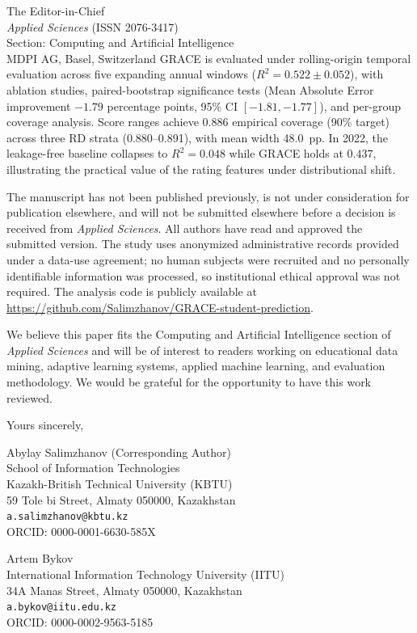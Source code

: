 \documentclass[12pt]{letter}
\begin{document}
\begin{letter}{The Editor-in-Chief \\
\textit{Applied Sciences} (ISSN 2076-3417) \\
Section: Computing and Artificial Intelligence \\
MDPI AG, Basel, Switzerland}
GRACE is evaluated under rolling-origin temporal evaluation across five expanding annual windows
($R^2 = 0.522 \pm 0.052$), with ablation studies, paired-bootstrap significance tests (Mean
Absolute Error improvement $-1.79$ percentage points, 95\% CI $[-1.81, -1.77]$), and per-group
coverage analysis. Score ranges achieve 0.886 empirical coverage (90\% target) across three RD strata (0.880--0.891), with mean width 48.0~pp.
In 2022, the leakage-free baseline collapses to $R^2 = 0.048$ while GRACE holds at $0.437$,
illustrating the practical value of the rating features under distributional shift.

The manuscript has not been published previously, is not under consideration for publication
elsewhere, and will not be submitted elsewhere before a decision is received from
\textit{Applied Sciences}. All authors have read and approved the submitted version. The study
uses anonymized administrative records provided under a data-use agreement; no human subjects
were recruited and no personally identifiable information was processed, so institutional ethical
approval was not required. The analysis code is publicly available at
\url{https://github.com/Salimzhanov/GRACE-student-prediction}.

We believe this paper fits the Computing and Artificial Intelligence section of
\textit{Applied Sciences} and will be of interest to readers working on educational data mining,
adaptive learning systems, applied machine learning, and evaluation methodology. We would be
grateful for the opportunity to have this work reviewed.

\closing{Yours sincerely,}

\noindent Abylay Salimzhanov (Corresponding Author)\\
School of Information Technologies\\
Kazakh-British Technical University (KBTU)\\
59 Tole bi Street, Almaty 050000, Kazakhstan\\
\texttt{a.salimzhanov@kbtu.kz}\\
ORCID: 0000-0001-6630-585X

\bigskip

\noindent Artem Bykov\\
International Information Technology University (IITU)\\
34A Manas Street, Almaty 050000, Kazakhstan\\
\texttt{a.bykov@iitu.edu.kz}\\
ORCID: 0000-0002-9563-5185


\end{letter}
\end{document}
